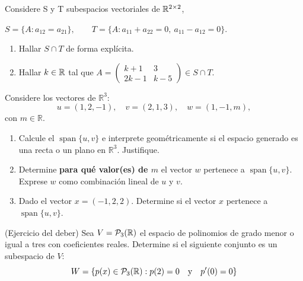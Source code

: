 \documentclass[10pt,a4]{examenEPN0}
\begin{document}
\begin{preguntas}
\item Considere S y T subespacios vectoriales de $\mathbb{R}^{2\times2}$,
\begin{center}
$S=\{A : a_{12}=a_{21}\},\qquad
T=\{A : a_{11}+a_{22}=0,\ a_{11}-a_{12}=0\}.$
\end{center}
\begin{enumerate}
\item Hallar $S\cap T$ de forma explícita. 
\item Hallar $k\in\mathbb{R}$ tal que $A=\begin{pmatrix}k+1&3\\2k-1&k-5\end{pmatrix}\in S\cap T$. 
\end{enumerate}
\newpage
\item Considere los vectores de \(\mathbb{R}^3\):
\[
u = (1, 2, -1), \quad v = (2, 1, 3), \quad w = (1, -1, m),
\]
con \(m \in \mathbb{R}\).

\begin{enumerate}
    \item Calcule el \(\operatorname{span}\{u, v\}\) e interprete geométricamente si el espacio generado es una recta o un plano en \(\mathbb{R}^3\). Justifique.  
    \item Determine \textbf{para qué valor(es) de \(m\)} el vector \(w\) pertenece a \(\operatorname{span}\{u, v\}\). Exprese $w$ como combinación lineal de $u$ y $v$.  
    \item Dado el vector \(x = (-1, 2, 2)\). Determine si el vector \(x\) pertenece a \(\operatorname{span}\{u, v\}\).  
   
\end{enumerate}
\newpage

\item (Ejercicio del deber) Sea $V = \mathcal{P}_3(\mathbb{R})$ el espacio de polinomios de grado menor o igual a tres con coeficientes reales. Determine si el siguiente conjunto es un subespacio de $V$:  
    \[
    W = \left\{ p(x) \in \mathcal{P}_3(\mathbb{R}) : p(2) = 0 \quad \text{y} \quad p'(0) = 0 \right\}
    \]      




\end{preguntas}
\end{document}
